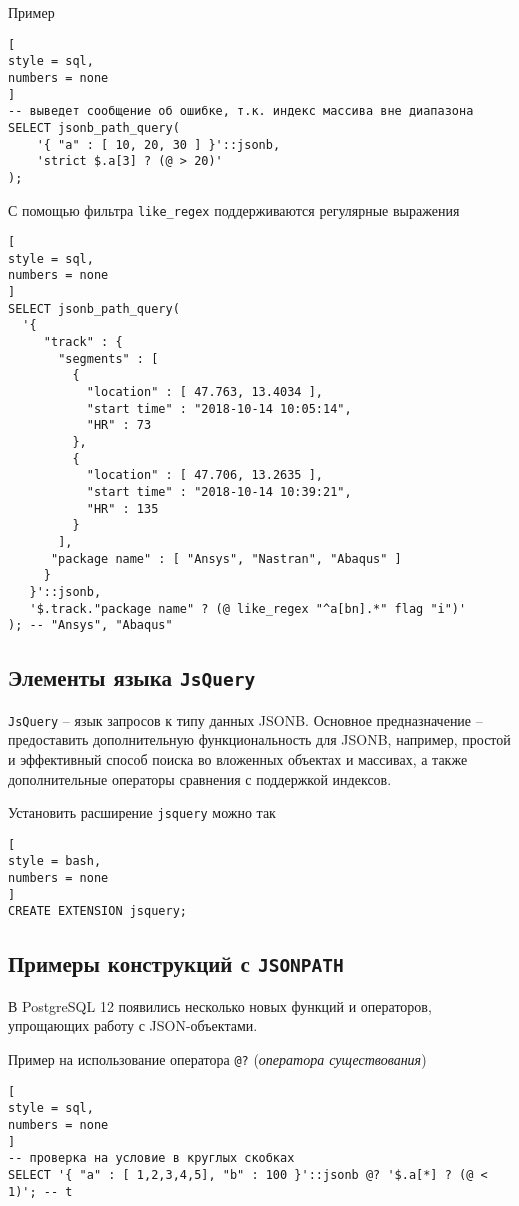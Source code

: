 \documentclass[%
	11pt,
	a4paper,
	utf8,
		]{article}
\begin{document}
Пример
\begin{lstlisting}[
style = sql,
numbers = none
]
-- выведет сообщение об ошибке, т.к. индекс массива вне диапазона
SELECT jsonb_path_query(
    '{ "a" : [ 10, 20, 30 ] }'::jsonb,
    'strict $.a[3] ? (@ > 20)'
);
\end{lstlisting}

С помощью фильтра \verb|like_regex| поддерживаются регулярные выражения
\begin{lstlisting}[
style = sql,
numbers = none
]
SELECT jsonb_path_query(
  '{
     "track" : {
       "segments" : [
         {
           "location" : [ 47.763, 13.4034 ],
           "start time" : "2018-10-14 10:05:14",
           "HR" : 73
         },
         {
           "location" : [ 47.706, 13.2635 ],
           "start time" : "2018-10-14 10:39:21",
           "HR" : 135
         }
       ],
      "package name" : [ "Ansys", "Nastran", "Abaqus" ]
     }
   }'::jsonb,
   '$.track."package name" ? (@ like_regex "^a[bn].*" flag "i")'
); -- "Ansys", "Abaqus"
\end{lstlisting}

\subsection{Элементы языка \texttt{JsQuery}}

\texttt{JsQuery} -- язык запросов к типу данных JSONB. Основное предназначение -- предоставить дополнительную функциональность для JSONB, например, простой и эффективный способ поиска во вложенных объектах и массивах, а также дополнительные операторы сравнения с поддержкой индексов.

Установить расширение \texttt{jsquery} можно так
\begin{lstlisting}[
style = bash,
numbers = none
]
CREATE EXTENSION jsquery;
\end{lstlisting}
 


\subsection{Примеры конструкций с \texttt{JSONPATH}}

В PostgreSQL 12 появились несколько новых функций и операторов, упрощающих работу с JSON-объектами.

Пример на использование оператора \verb|@?| (\emph{оператора существования})
\begin{lstlisting}[
style = sql, 
numbers = none
]
-- проверка на условие в круглых скобках
SELECT '{ "a" : [ 1,2,3,4,5], "b" : 100 }'::jsonb @? '$.a[*] ? (@ < 1)'; -- t
\end{lstlisting}
\end{document}
